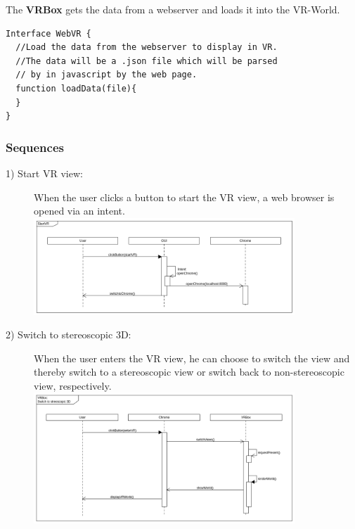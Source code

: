 The \textbf{VRBox} gets the data from a webserver and loads it into the VR-World.

\begin{lstlisting}
Interface WebVR {
  //Load the data from the webserver to display in VR.
  //The data will be a .json file which will be parsed
  // by in javascript by the web page.
  function loadData(file){
  }
}
\end{lstlisting}

\subsubsection{Sequences}

\begin{description}
	\item[1) Start VR view:] When the user clicks a button to start the VR view, a web browser is opened via an intent.  \\
	\includegraphics[width=0.8\textwidth]{diagramms/startVR.png}

	\item[2) Switch to stereoscopic 3D: ] When the user enters the VR view, he can choose to switch the view and thereby switch to a stereoscopic view or switch back to non-stereoscopic view, respectively. \\
	\includegraphics[width=0.8\textwidth]{diagramms/stereo.png}


\end{description}
